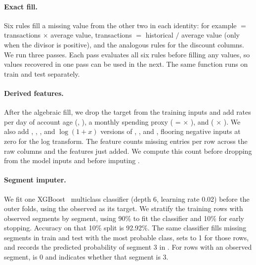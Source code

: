 \documentclass[../main.tex]{subfiles}
\begin{document}
\paragraph{Exact fill.} Six rules fill a missing value from the other two in each identity: for example  $=$ transactions $\times$ average value, transactions $=$ historical $/$ average value (only when the divisor is positive), and the analogous rules for the discount columns. We run three passes. Each pass evaluates all six rules before filling any values, so values recovered in one pass can be used in the next. The same function runs on train and test separately.

\paragraph{Derived features.} After the algebraic fill, we drop the target from the training inputs and add rates per day of account age (, ), a monthly spending proxy ( =  $\times$ ), and  ( $\times$ ). We also add , , , and $\log(1+x)$ versions of , , and , flooring negative inputs at zero for the log transform. The feature  counts missing entries per row across the raw columns and the features just added. We compute this count before dropping  from the model inputs and before imputing .

\paragraph{Segment imputer.} We fit one XGBoost~\citep{xgboost} multiclass classifier (depth 6, learning rate 0.02) before the outer folds, using the observed  as its target. We stratify the training rows with observed segments by segment, using 90\% to fit the classifier and 10\% for early stopping. Accuracy on that 10\% split is 92.92\%. The same classifier fills missing segments in train and test with the most probable class, sets  to 1 for those rows, and records the predicted probability of segment 3 in . For rows with an observed segment,  is 0 and  indicates whether that segment is 3.
\end{document}
